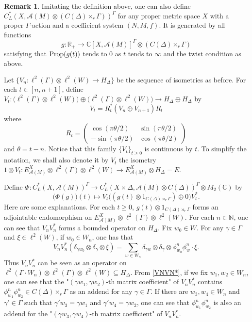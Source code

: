 \documentclass[11pt]{article}
\theoremstyle{definition}
\newtheorem{Rem}[Def]{Remark}
\theoremstyle{plain}
\def\IN{\mathbb N}\def\IR{\mathbb R}\def\IE{\mathbb E}\def\IC{\mathbb C}\def\IL{\mathbb L}\def\IQ{\mathbb Q}\def\IA{\mathbb A}\def\IZ{\mathbb Z}
\def\A{\mathcal A}\def\C{\mathcal C}\def\B{\mathcal B}\def\E{\mathcal E}\def\O{\mathcal O}\def\h{\mathfrak h}\def\K{\mathcal K}\def\F{\mathcal F}\def\P{\mathcal P}\def\L{\mathcal L}\def\R{\mathcal R}\def\Q{\mathcal Q}\def\H{\mathcal H}\def\S{\mathcal S}\def\N{\mathcal N}\def\U{\mathcal U}\def\V{\mathcal V}
\def\prop{\textup{Prop}}
\def\ox{\otimes}
\def\ox{\otimes}
\def\Ga{\Gamma}
\begin{document}
\begin{Rem}\label{imitating}
Imitating the definition above, one can also define $C^*_L(X,\A(M)\ox(C(\Delta)\rtimes_r\Ga))^{\Ga}$ for any proper metric space $X$ with a proper $\Ga$-action and a coefficient system $(N,M,f)$. It is generated by all functions
$$g:\IR_+\to\IC[X,\A(M)]^{\Ga}\ox (C(\Delta)\rtimes_r\Ga)$$
satisfying that $\prop(g(t))$ tends to $0$ as $t$ tends to $\infty$ and the twist condition as above.
\end{Rem}

Let $\{V_n:\ell^2(\Ga)\ox\ell^2(W)\to H_{\Delta}\}$ be the sequence of isometries as before. For each $t\in[n,n+1]$, define $V_t:\Big(\ell^2(\Ga)\ox\ell^2(W)\Big)\oplus\Big(\ell^2(\Ga)\ox\ell^2(W)\Big)\to H_{\Delta}\oplus H_{\Delta}$ by
$$V_t=R_t^*(V_n\oplus V_{n+1})R_t$$
where
$$R_t=\begin{pmatrix}\cos(\pi\theta/2)&\sin(\pi\theta/2)\\-\sin(\pi\theta/2)&\cos(\pi\theta/2)\end{pmatrix}$$
and $\theta=t-n$. Notice that this family $\{V_t\}_{t\geq 0}$ is continuous by $t$. To simplify the notation, we shall also denote it by $V_t$ the isometry $1\ox V_t: E^X_{\A(M)}\ox\ell^2(\Ga)\ox\ell^2(W)\to E^{X}_{\A(M)}\ox H_\Delta=E$.


Define $\Phi:C^*_L(X,\A(M))^{\Ga}\to C^*_L(X\times\Delta,\A(M)\ox C(\Delta))^{\Ga}\ox M_2(\IC)$ by
$$\Big(\Phi(g)\Big)(t)\mapsto V_t\Big((g(t)\ox 1_{C(\Delta)\rtimes_r\Ga})\oplus 0\Big)V_t^*.$$
Here are some explanations. For each $t\geq 0$, $g(t)\ox 1_{C(\Delta)\rtimes_r\Ga}$ forms an adjointable endomorphism on $E^X_{\A(M)}\ox\ell^2(\Ga)\ox\ell^2(W)$. For each $n\in\IN$, one can see that $V_nV^*_n$ forms a bounded operator on $H_\Delta$. Fix $w_0\in W$. For any $\gamma\in\Ga$ and $\xi\in\ell^2(W)$, if $w_0\in W_n$, one has that
\begin{equation}\label{VNVN*}V_nV_n^*(\delta_{\gamma w_0}\ox\delta_\gamma\ox\xi)=\sum_{w\in W_n}\delta_{\gamma w}\ox\delta_\gamma\ox\phi^n_{w_0}\phi_w^n\cdot\xi.\end{equation}
Thus $V_nV^*_n$ can be seen as an operator on $\ell^2(\Ga\cdot W_n)\ox\ell^2(\Ga)\ox\ell^2(W)\subseteq H_\Delta$. From \eqref{VNVN*}, if we fix $w_1,w_2\in W_n$, one can see that the "$(\gamma w_1,\gamma w_2)$-th matrix coefficient" of $V_nV_n^*$ contains $\phi_{w_1}^n\phi^n_{w_2}\in C(\Delta)\rtimes_r\Ga$ as an addend for any $\gamma\in\Ga$. If there are $w_3,w_4\in W_n$ and $\gamma'\in\Ga$ such that $\gamma'w_3=\gamma w_1$ and $\gamma'w_4=\gamma w_2$, one can see that $\phi_{w_1}^n\phi^n_{w_2}$ is also an addend for the "$(\gamma w_3,\gamma w_4)$-th matrix coefficient" of $V_nV_n^*$.
\end{document}
